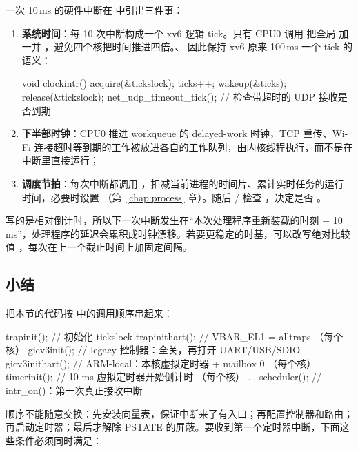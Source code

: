 一次 10\,ms 的硬件中断在  中引出三件事：

\begin{enumerate}
  \item \textbf{系统时间}：每 10 次中断构成一个 xv6 逻辑 tick。只有 CPU0 调用  把全局  加一并 ，避免四个核把时间推进四倍。、 因此保持 xv6 原来 100\,ms 一个 tick 的语义：
\begin{ccode}
void clockintr()
{
  acquire(&tickslock);
  ticks++;
  wakeup(&ticks);
  release(&tickslock);
  net_udp_timeout_tick();       // 检查带超时的 UDP 接收是否到期
}
\end{ccode}
  \item \textbf{下半部时钟}：CPU0 推进 workqueue 的 delayed-work 时钟，TCP 重传、Wi-Fi 连接超时等到期的工作被放进各自的工作队列，由内核线程执行，而不是在中断里直接运行；
  \item \textbf{调度节拍}：每次中断都调用 ，扣减当前进程的时间片、累计实时任务的运行时间，必要时设置 （第~\ref{chap:process} 章）。随后 / 检查 ，决定是否 。
\end{enumerate}

 写的是相对倒计时，所以下一次中断发生在“本次处理程序重新装载的时刻 $+$ 10\,ms”，处理程序的延迟会累积成时钟漂移。若要更稳定的时基，可以改写绝对比较值 ，每次在上一个截止时间上加固定间隔。

\subsection{小结}

把本节的代码按  中的调用顺序串起来：

\begin{ccode}
trapinit();        // 初始化 tickslock
trapinithart();    // VBAR_EL1 = alltraps                   （每个核）
gicv3init();       // legacy 控制器：全关，再打开 UART/USB/SDIO
gicv3inithart();   // ARM-local：本核虚拟定时器 + mailbox 0  （每个核）
timerinit();       // 10 ms 虚拟定时器开始倒计时            （每个核）
...
scheduler();       // intr_on()：第一次真正接收中断
\end{ccode}

顺序不能随意交换：先安装向量表，保证中断来了有入口；再配置控制器和路由；再启动定时器；最后才解除 PSTATE 的屏蔽。要收到第一个定时器中断，下面这些条件必须同时满足：

